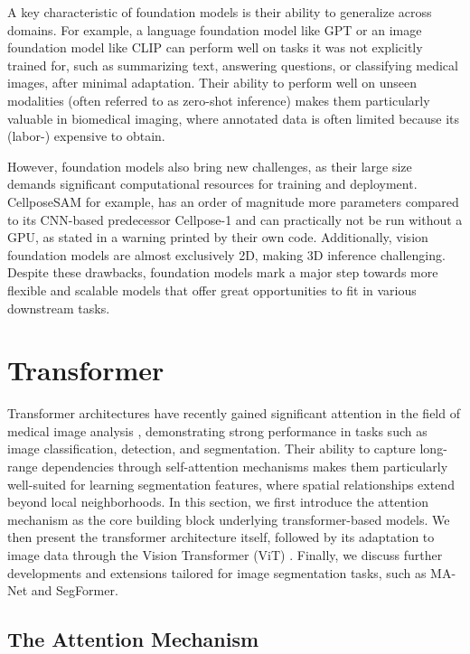 A key characteristic of foundation models is their ability to generalize across domains. For example, a language foundation model like GPT \cite{openai2024gpt4technicalreport} or an image foundation model like CLIP \cite{radford2021learningtransferablevisualmodels} can perform well on tasks it was not explicitly trained for, such as summarizing text, answering questions, or classifying medical images, after minimal adaptation. Their ability to perform well on unseen modalities (often referred to as zero-shot inference) makes them particularly valuable in biomedical imaging, where annotated data is often limited because its (labor-) expensive to obtain. 

However, foundation models also bring new challenges, as their large size demands significant computational resources for training and deployment. CellposeSAM \cite{Pachitariu.2025} for example, has an order of magnitude more parameters compared to its CNN-based predecessor Cellpose-1 and can practically not be run without a GPU, as stated in a warning printed by their own code.  
Additionally, vision foundation models are almost exclusively 2D, making 3D inference challenging. Despite these drawbacks, foundation models mark a major step towards more flexible and scalable models that offer great opportunities to fit in various downstream tasks.



\section{Transformer}

Transformer architectures have recently gained significant attention in the field of medical image analysis \cite{Ma.2024}, demonstrating strong performance in tasks such as image classification, detection, and segmentation. Their ability to capture long-range dependencies through self-attention mechanisms makes them particularly well-suited for learning segmentation features, where spatial relationships extend beyond local neighborhoods. In this section, we first introduce the attention mechanism as the core building block underlying transformer-based models. We then present the transformer architecture itself, followed by its adaptation to image data through the Vision Transformer (ViT) \cite{dosovitskiy2021imageworth16x16words}. Finally, we discuss further developments and extensions tailored for image segmentation tasks, such as MA-Net and SegFormer.

\subsection{The Attention Mechanism}

